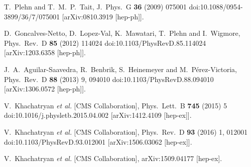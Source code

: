   T.~Plehn and T.~M.~P.~Tait,
  J.\ Phys.\ G {\bf 36} (2009) 075001
  doi:10.1088/0954-3899/36/7/075001
  [arXiv:0810.3919 [hep-ph]].

  D.~Goncalves-Netto, D.~Lopez-Val, K.~Mawatari, T.~Plehn and I.~Wigmore,
  Phys.\ Rev.\ D {\bf 85} (2012) 114024
  doi:10.1103/PhysRevD.85.114024
  [arXiv:1203.6358 [hep-ph]].
  
  J.~A.~Aguilar-Saavedra, R.~Benbrik, S.~Heinemeyer and M.~Pérez-Victoria,
  Phys.\ Rev.\ D {\bf 88} (2013) 9,  094010
  doi:10.1103/PhysRevD.88.094010
  [arXiv:1306.0572 [hep-ph]].

  V.~Khachatryan {\it et al.} [CMS Collaboration],
  Phys.\ Lett.\ B {\bf 745} (2015) 5
  doi:10.1016/j.physletb.2015.04.002
  [arXiv:1412.4109 [hep-ex]].
  
  V.~Khachatryan {\it et al.} [CMS Collaboration],
  Phys.\ Rev.\ D {\bf 93} (2016) 1,  012001
  doi:10.1103/PhysRevD.93.012001
  [arXiv:1506.03062 [hep-ex]].

  V.~Khachatryan {\it et al.} [CMS Collaboration],
  arXiv:1509.04177 [hep-ex].
  
